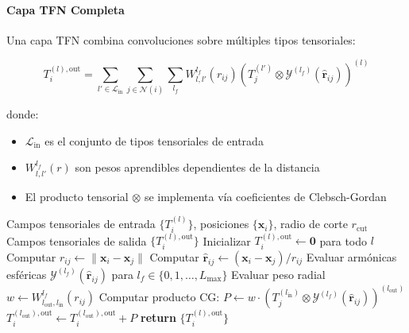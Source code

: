 \paragraph{Capa TFN Completa}

Una capa TFN combina convoluciones sobre múltiples tipos tensoriales:

\begin{equation}\label{eq:tfn_layer}
T_i^{(l), \text{out}} = \sum_{l' \in \mathcal{L}_{\text{in}}} \sum_{j \in \mathcal{N}(i)} \sum_{l_f} W^{l_f}_{l,l'}(r_{ij}) \left(T_j^{(l')} \otimes \mathcal{Y}^{(l_f)}(\hat{\mathbf{r}}_{ij})\right)^{(l)}
\end{equation}

donde:
\begin{itemize}
    \item $\mathcal{L}_{\text{in}}$ es el conjunto de tipos tensoriales de entrada
    \item $W^{l_f}_{l,l'}(r)$ son pesos aprendibles dependientes de la distancia
    \item El producto tensorial $\otimes$ se implementa vía coeficientes de Clebsch-Gordan
\end{itemize}

\begin{algorithm}[h]
\caption{Paso Hacia Adelante de Capa TFN}
\label{alg:tfn_forward}
\begin{algorithmic}[1]
\Require Campos tensoriales de entrada $\{T_i^{(l)}\}$, posiciones $\{\mathbf{x}_i\}$, radio de corte $r_{\text{cut}}$
\Ensure Campos tensoriales de salida $\{T_i^{(l), \text{out}}\}$
    \State Inicializar $T_i^{(l), \text{out}} \leftarrow \mathbf{0}$ para todo $l$
        \State Computar $r_{ij} \leftarrow \|\mathbf{x}_i - \mathbf{x}_j\|$
        \State Computar $\hat{\mathbf{r}}_{ij} \leftarrow (\mathbf{x}_i - \mathbf{x}_j) / r_{ij}$
        \State Evaluar armónicas esféricas $\mathcal{Y}^{(l_f)}(\hat{\mathbf{r}}_{ij})$ para $l_f \in \{0, 1, \ldots, L_{\max}\}$
                    \State Evaluar peso radial $w \leftarrow W^{l_f}_{l_{\text{out}}, l_{\text{in}}}(r_{ij})$
                    \State Computar producto CG: $P \leftarrow w \cdot (T_j^{(l_{\text{in}})} \otimes \mathcal{Y}^{(l_f)}(\hat{\mathbf{r}}_{ij}))^{(l_{\text{out}})}$
                    \State $T_i^{(l_{\text{out}}), \text{out}} \leftarrow T_i^{(l_{\text{out}}), \text{out}} + P$
                \EndFor
            \EndFor
        \EndFor
    \EndFor
\EndFor
\State \textbf{return} $\{T_i^{(l), \text{out}}\}$
\end{algorithmic}
\end{algorithm}

